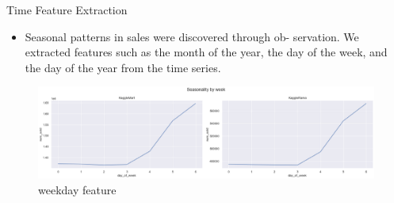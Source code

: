 \documentclass[
 size=14pt,
 paper=smartboard,  %
 mode=present, 		%
 display=slides, 	%
 style=tuliplab,  	%
 pauseslide,
 fleqn,leqno]{powerdot}
\begin{document}
\begin{slide}[toc=,bm=]{Time Feature Extraction}
		\begin{itemize}
		\item
Seasonal patterns in sales were discovered through ob-
servation. We extracted features such as the month of the year, the day of the week, and the day of the year from the time series.
\end{itemize}

	\begin{figure}
		\centering
		\includegraphics[scale=0.4]{week-feature.eps}
		\caption{weekday feature}\label{fig:OutAspect-target}
	\end{figure}
\end{slide}
\end{document}
